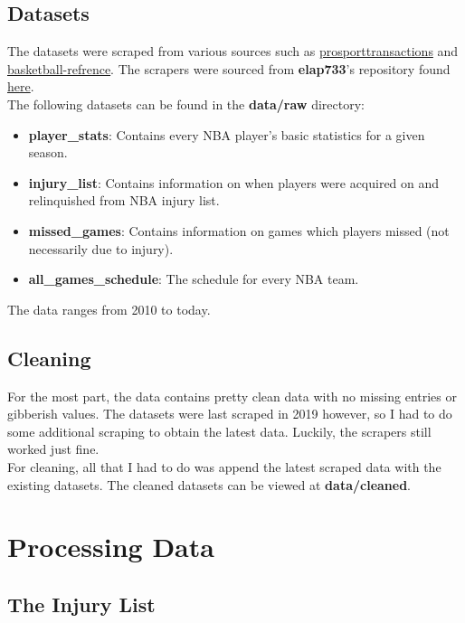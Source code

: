 \documentclass{article}
\begin{document}
\subsection*{Datasets}

The datasets were scraped from various sources such as 
\href{https://www.prosportstransactions.com/basketball}{prosporttransactions} and 
\href{https://www.basketball-reference.com/}{basketball-refrence}. The scrapers
were sourced from \textbf{elap733}'s repository found
\href{https://github.com/elap733/NBA-Injuries-Analysis/tree/master/src/d01_scrapes}{here}.\\

The following datasets can be found in the \textbf{data/raw} directory:
\begin{itemize}
    \item \textbf{player\_stats}: Contains every NBA player's basic statistics for a given season.
    \item \textbf{injury\_list}: Contains information on when players were acquired on and relinquished from NBA injury list.
    \item \textbf{missed\_games}: Contains information on games which players missed (not necessarily due to injury).
    \item \textbf{all\_games\_schedule}: The schedule for every NBA team.
\end{itemize}

The data ranges from 2010 to today.

\subsection*{Cleaning}

For the most part, the data contains pretty clean data with no missing entries
or gibberish values. The datasets were last scraped in 2019 however, so I had to 
do some additional scraping to obtain the latest data. Luckily, the scrapers 
still worked just fine.\\

For cleaning, all that I had to do was append the latest scraped data
with the existing datasets. The cleaned datasets can be viewed at \textbf{data/cleaned}.

\section*{Processing Data}

\subsection*{The Injury List}
\end{document}
